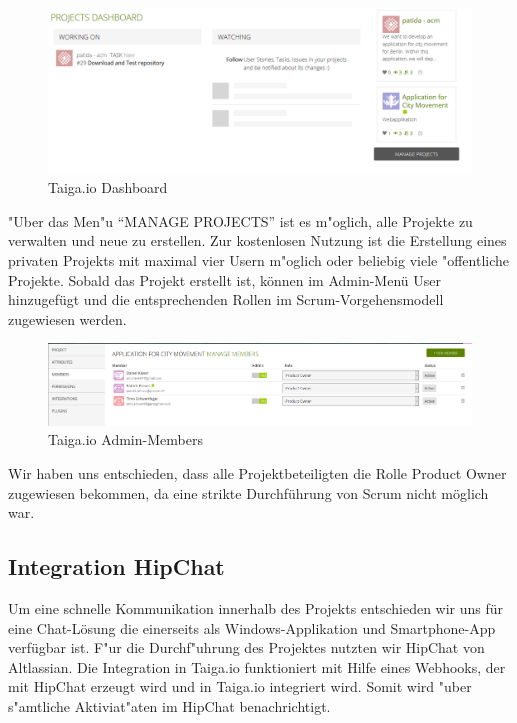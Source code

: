 \documentclass[a4paper, 11pt]{scrreprt}
\begin{document}
\begin{figure} [H]
\begin{center}


\includegraphics[width=16cm]{dashboard.png}
\caption{Taiga.io Dashboard}

\end{center}
\end{figure}

"Uber das Men"u "`MANAGE PROJECTS"' ist es m"oglich, alle Projekte zu verwalten und neue zu erstellen. Zur kostenlosen Nutzung ist die Erstellung eines privaten Projekts mit maximal vier Usern m"oglich oder beliebig viele "offentliche Projekte. Sobald das Projekt erstellt ist, können im Admin-Menü User hinzugefügt und die entsprechenden Rollen im Scrum-Vorgehensmodell zugewiesen werden.

\begin{figure} [H]
\begin{center}


\includegraphics[width=16cm]{members.png}
\caption{Taiga.io Admin-Members}

\end{center}
\end{figure}

Wir haben uns entschieden, dass alle Projektbeteiligten die Rolle Product Owner zugewiesen bekommen, da eine strikte Durchführung von Scrum nicht möglich war.

\subsection{Integration HipChat}

Um eine schnelle Kommunikation innerhalb des Projekts entschieden wir uns für eine Chat-Lösung die einerseits als Windows-Applikation und Smartphone-App verfügbar ist. F"ur die Durchf"uhrung des Projektes nutzten wir HipChat von Altlassian. Die Integration in Taiga.io funktioniert mit Hilfe eines Webhooks, der mit HipChat erzeugt wird und in Taiga.io integriert wird. Somit wird "uber s"amtliche Aktiviat"aten im HipChat benachrichtigt.
\end{document}
